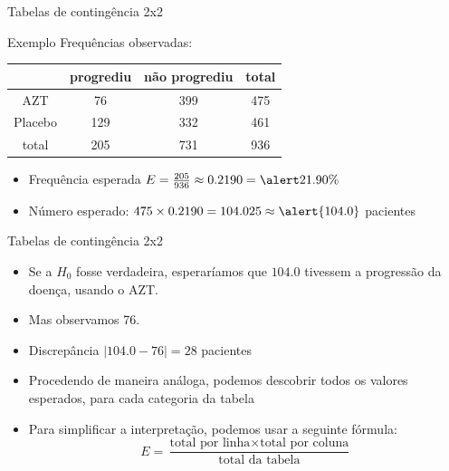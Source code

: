 \documentclass{beamer}
\begin{document}
\begin{frame}{Tabelas de contingência 2x2}
  \begin{exampleblock}{Exemplo}
    Frequências observadas:
    \begin{tabular}{c|c|c|c}
      & progrediu & não progrediu & total\\
      \hline
      AZT & 76 & 399 & 475\\
      \hline
      Placebo & 129 & 332 & 461\\
      \hline
      total & \alert{205} & 731 & \alert{936}\\
    \end{tabular}
  \end{exampleblock}
  \begin{itemize}
  \item Frequência esperada $E = \frac{205}{936} \approx 0.2190 = \alert{21.90\%}$
  \item Número esperado: $475 \times 0.2190 = 104.025 \approx \alert{104.0}$
    pacientes
  \end{itemize}
\end{frame}

\begin{frame}{Tabelas de contingência 2x2}
  \begin{itemize}
  \item Se a $H_0$ fosse verdadeira, esperaríamos que $104.0$ tivessem
    a progressão da doença, usando o AZT.
  \item Mas observamos 76.
  \item Discrepância $|104.0 - 76| = 28$ pacientes
  \item Procedendo de maneira análoga, podemos descobrir todos os
    valores esperados, para cada categoria da tabela
  \item Para simplificar a interpretação, podemos usar a seguinte fórmula:
  \begin{displaymath}
    E = \frac{ \text{total por linha} \times \text{total por coluna}
    }{ \text{total da tabela} }
  \end{displaymath}
  \end{itemize}
\end{frame}
\end{document}
